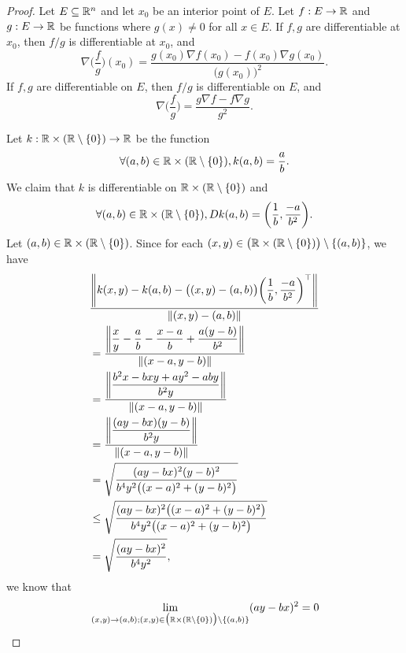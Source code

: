 \begin{proof}
  Let \(E \subseteq \R^n\) and let \(x_0\) be an interior point of \(E\).
  Let \(f : E \to \R\) and \(g : E \to \R\) be functions where \(g(x) \neq 0\) for all \(x \in E\).
  If \(f, g\) are differentiable at \(x_0\), then \(f / g\) is differentiable at \(x_0\), and
  \[
    \nabla \bigg(\dfrac{f}{g}\bigg)(x_0) = \dfrac{g(x_0) \nabla f(x_0) - f(x_0) \nabla g(x_0)}{\big(g(x_0)\big)^2}.
  \]
  If \(f, g\) are differentiable on \(E\), then \(f / g\) is differentiable on \(E\), and
  \[
    \nabla \bigg(\dfrac{f}{g}\bigg) = \dfrac{g \nabla f - f \nabla g}{g^2}.
  \]

  Let \(k : \R \times (\R \setminus \set{0}) \to \R\) be the function
  \[
    \forall (a, b) \in \R \times (\R \setminus \set{0}), k(a, b) = \dfrac{a}{b}.
  \]
  We claim that \(k\) is differentiable on \(\R \times (\R \setminus \set{0})\) and
  \[
    \forall (a, b) \in \R \times (\R \setminus \set{0}), D k(a, b) = \bigg(\dfrac{1}{b}, \dfrac{-a}{b^2}\bigg).
  \]
  Let \((a, b) \in \R \times (\R \setminus \set{0})\).
  Since for each \((x, y) \in \big(\R \times (\R \setminus \set{0})\big) \setminus \set{(a, b)}\), we have
  \begin{align*}
     & \dfrac{\norm*{k(x, y) - k(a, b) - \big((x, y) - (a, b)\big) \bigg(\dfrac{1}{b}, \dfrac{-a}{b^2}\bigg)^\top}}{\norm*{(x, y) - (a, b)}} \\
     & = \dfrac{\norm*{\dfrac{x}{y} - \dfrac{a}{b} - \dfrac{x - a}{b} + \dfrac{a(y - b)}{b^2}}}{\norm*{(x - a, y - b)}}                      \\
     & = \dfrac{\norm*{\dfrac{b^2 x - bxy + ay^2 - aby}{b^2y}}}{\norm*{(x - a, y - b)}}                                                      \\
     & = \dfrac{\norm*{\dfrac{(ay - bx)(y - b)}{b^2y}}}{\norm*{(x - a, y - b)}}                                                              \\
     & = \sqrt{\dfrac{(ay - bx)^2 (y - b)^2}{b^4 y^2 \big((x - a)^2 + (y - b)^2\big)}}                                                       \\
     & \leq \sqrt{\dfrac{(ay - bx)^2 \big((x - a)^2 + (y - b)^2\big)}{b^4 y^2 \big((x - a)^2 + (y - b)^2\big)}}                              \\
     & = \sqrt{\dfrac{(ay - bx)^2}{b^4 y^2}},
  \end{align*}
  we know that
  \begin{align*}
             & \lim_{(x, y) \to (a, b) ; (x, y) \in \big(\R \times (\R \setminus \set{0})\big) \setminus \set{(a, b)}} (ay - bx)^2 = 0                                                                                                                     \\

\end{align*}
\end{proof}
